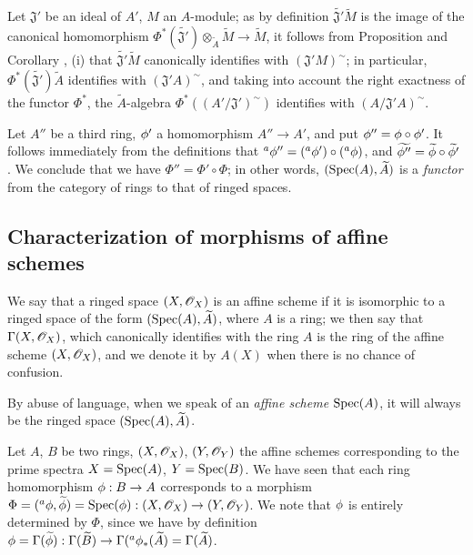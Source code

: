 \begin{env}[1.6.9]
\label{1.1.6.9}
Let $\mathfrak{J}'$ be an ideal of $A'$, $M$ an $A$-module; as by definition
$\widetilde{\mathfrak{J}'}\widetilde{M}$ is the image of the canonical homomorphism
$\Phi^*(\widetilde{\mathfrak{J}'})\otimes_{\widetilde{A}}\widetilde{M}\to\widetilde{M}$, it
follows from Proposition  and
Corollary , (i) that
$\widetilde{\mathfrak{J}'}\widetilde{M}$ canonically identifies with $(\mathfrak{J}' M)^\sim$;
in particular, $\Phi^*(\widetilde{\mathfrak{J}'})\widetilde{A}$ identifies with
$(\mathfrak{J}' A)^\sim$, and taking into account the right exactness of the functor $\Phi^*$,
the $\widetilde{A}$-algebra $\Phi^*((A'/\mathfrak{J}')^\sim)$ identifies with
$(A/\mathfrak{J}' A)^\sim$.
\end{env}

\begin{env}[1.6.10]
\label{1.1.6.10}
Let $A''$ be a third ring, $\phi'$ a homomorphism $A''\to A'$, and put
$\phi''=\phi\circ\phi'$. It follows immediately from the definitions that
${}^a\phi''=({}^a\phi')\circ({}^a\phi)$, and
$\widetilde{\phi''}=\widetilde{\phi}\circ\widetilde{\phi'}$ . We conclude
that we have $\Phi''=\Phi'\circ\Phi$; in other words, $({\mathop{\mathrm{Spec}}\nolimits}(A),\widetilde{A})$ is a
{\em functor} from the category of rings to that of ringed spaces.
\end{env}

\subsection{Characterization of morphisms of affine schemes}
\label{subsection-morphisms-affine-schemes}

\begin{defn}[1.7.1]
\label{1.1.7.1}
We say that a ringed space $(X,\mathscr{O}_X)$ is an affine scheme if it is isomorphic to a ringed
space of the form $({\mathop{\mathrm{Spec}}\nolimits}(A),\widetilde{A})$, where $A$ is a ring; we then say that
$\Gamma(X,\mathscr{O}_X)$, which canonically identifies with the ring $A$  is the
ring of the affine scheme $(X,\mathscr{O}_X)$, and we denote it by $A(X)$ when there is no chance of
confusion.
\end{defn}

By abuse of language, when we speak of an {\em affine scheme ${\mathop{\mathrm{Spec}}\nolimits}(A)$}, it will always be
the ringed space $({\mathop{\mathrm{Spec}}\nolimits}(A),\widetilde{A})$.

\begin{env}[1.7.2]
\label{1.1.7.2}
Let $A$, $B$ be two rings, $(X,\mathscr{O}_X)$, $(Y,\mathscr{O}_Y)$ the affine schemes corresponding to
the prime spectra $X={\mathop{\mathrm{Spec}}\nolimits}(A)$, $Y={\mathop{\mathrm{Spec}}\nolimits}(B)$. We have seen  that each ring
homomorphism $\phi:B\to A$ corresponds to a morphism
$\Phi=({}^a\phi,\widetilde{\phi})={\mathop{\mathrm{Spec}}\nolimits}(\phi):(X,\mathscr{O}_X)\to(Y,\mathscr{O}_Y)$. We note that $\phi$
is entirely determined by $\Phi$, since we have by definition
$\phi=\Gamma(\widetilde{\phi}):\Gamma(\widetilde{B})
\to\Gamma({}^a\phi_*(\widetilde{A})=\Gamma(\widetilde{A})$.
\end{env}

